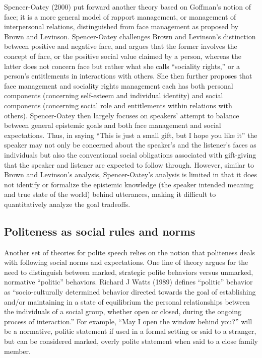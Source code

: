 \documentclass[oneside]{report}
\begin{document}
Spencer-Oatey (2000) put forward another theory based on Goffman's
notion of face; it is a more general model of rapport management, or
management of interpersonal relations, distinguished from face
management as proposed by Brown and Levinson. Spencer-Oatey challenges
Brown and Levinson's distinction between positive and negative face, and
argues that the former involves the concept of face, or the positive
social value claimed by a person, whereas the latter does not concern
face but rather what she calls ``sociality rights,'' or a person's
entitlements in interactions with others. She then further proposes that
face management and sociality rights management each has both personal
components (concerning self-esteem and individual identity) and social
components (concerning social role and entitlements within relations
with others). Spencer-Oatey then largely focuses on speakers' attempt to
balance between general epistemic goals and both face management and
social expectations. Thus, in saying ``This is just a small gift, but I
hope you like it'' the speaker may not only be concerned about the
speaker's and the listener's faces as individuals but also the
conventional social obligations associated with gift-giving that the
speaker and listener are expected to follow through. However, similar to
Brown and Levinson's analysis, Spencer-Oatey's analysis is limited in
that it does not identify or formalize the epistemic knowledge (the
speaker intended meaning and true state of the world) behind utterances,
making it difficult to quantitatively analyze the goal tradeoffs.

\subsection{Politeness as social rules and
norms}\label{politeness-as-social-rules-and-norms}

Another set of theories for polite speech relies on the notion that
politeness deals with following social norms and expectations. One line
of theory argues for the need to distinguish between marked, strategic
polite behaviors versus unmarked, normative ``politic'' behaviors.
Richard J Watts (1989) defines ``politic'' behavior as
``socio-culturally determined behavior directed towards the goal of
establishing and/or maintaining in a state of equilibrium the personal
relationships between the individuals of a social group, whether open or
closed, during the ongoing process of interaction.'' For example, ``May
I open the window behind you?'' will be a normative, politic statement
if used in a formal setting or said to a stranger, but can be considered
marked, overly polite statement when said to a close family member.
\end{document}
